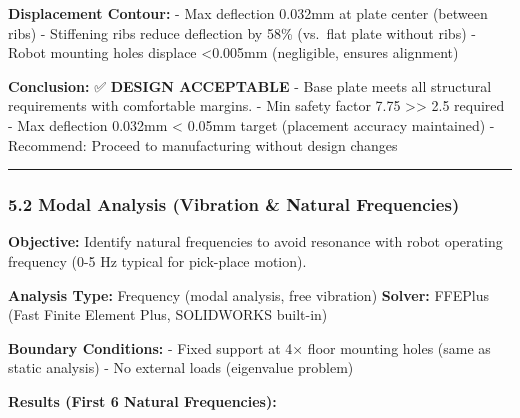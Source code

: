 \documentclass[
]{article}
\begin{document}
\textbf{Displacement Contour:} - Max deflection 0.032mm at plate center
(between ribs) - Stiffening ribs reduce deflection by 58\% (vs.~flat
plate without ribs) - Robot mounting holes displace \textless0.005mm
(negligible, ensures alignment)

\textbf{Conclusion:} ✅ \textbf{DESIGN ACCEPTABLE} - Base plate meets
all structural requirements with comfortable margins. - Min safety
factor 7.75 \textgreater\textgreater{} 2.5 required - Max deflection
0.032mm \textless{} 0.05mm target (placement accuracy maintained) -
Recommend: Proceed to manufacturing without design changes

\begin{center}\rule{0.5\linewidth}{0.5pt}\end{center}

\hypertarget{modal-analysis-vibration-natural-frequencies}{%
\subsubsection{5.2 Modal Analysis (Vibration \& Natural
Frequencies)}\label{modal-analysis-vibration-natural-frequencies}}

\textbf{Objective:} Identify natural frequencies to avoid resonance with
robot operating frequency (0-5 Hz typical for pick-place motion).

\textbf{Analysis Type:} Frequency (modal analysis, free vibration)
\textbf{Solver:} FFEPlus (Fast Finite Element Plus, SOLIDWORKS built-in)

\textbf{Boundary Conditions:} - Fixed support at 4× floor mounting holes
(same as static analysis) - No external loads (eigenvalue problem)

\textbf{Results (First 6 Natural Frequencies):}
\end{document}
